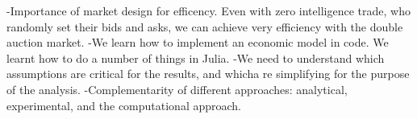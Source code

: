 -Importance of market design for efficency. Even with zero intelligence trade, who randomly set their bids and asks, 
we can achieve very efficiency with the double auction market.
-We learn how to implement an economic model in code. We learnt how to do a number of things in Julia. 
-We need to understand which assumptions are critical for the results, and whicha re simplifying for the purpose of the 
analysis. 
-Complementarity of different approaches: analytical, experimental, and the computational approach. 